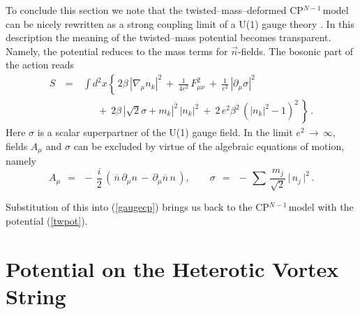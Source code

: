 \documentclass[12pt]{article}
\def\beq{\begin{equation}}
\def\eeq{\end{equation}}
\def\beqn{\begin{eqnarray}}
\def\eeqn{\end{eqnarray}}
\def\beqn{\begin{eqnarray}}
\def\eeqn{\end{eqnarray}}
\newcommand{\pt}{\partial}
\newcommand{\ov}{\overline}
\newcommand{\nbar}{\ov{n}}
\newcommand{\cpn}{CP$^{N-1}$\,}
\begin{document}
	To conclude this section we note that the twisted--mass--deformed \cpn model can be nicely rewritten as a
	strong coupling limit of a U(1) gauge theory \cite{HaHo}. 
	In this description the meaning of the twisted--mass potential becomes  transparent. 
	Namely, the potential  reduces to the mass terms for $\vec{n}$-fields.  
	The bosonic part of the action reads
\beqn
%	
	S 
	& ~=~ &
	\int d^2 x \left\{\,
	 2\beta\,|\nabla_{\mu} n_{k}|^2 ~+~ \frac1{4e^2}\, F^2_{\mu\nu} ~+~ \frac1{e^2}\, |\pt_{\mu}\sigma|^2
	\right.
\nonumber\\[3mm]
%
	&& \quad~ 
	~+~ \left. 2\beta\,| \sqrt{2}\sigma + m_k |^2\, |n_{k}|^2 ~+~
	2\, e^2 \beta^2\, (|n_{k}|^2 -1)^2
	\,\right\}\,.
\label{gaugecp}
\eeqn
	Here $\sigma$ is a scalar superpartner of the U(1) gauge field.
	In the limit $ e^2 \,\to\, \infty$, fields $A_{\mu}$ and $\sigma$ can be excluded by virtue of the algebraic
	equations of motion, namely
\beq
	A_{\mu} ~~=~~ -\, \frac{i}{2}\,\left(\, \nbar\, \pt_{\mu}n \,-\, \pt_{\mu}\nbar \,n \,\right),
\qquad 
	\sigma    ~~=~~    -\, \sum\, \frac{m_j}{\sqrt{2}}\, \big|\, n_j \,\big|^2\,.
\label{Asigma}
\eeq

	Substitution of this into (\ref{gaugecp}) brings us back to the \cpn model with the potential (\ref{twpot}).



\section{Potential on the Heterotic Vortex String}
\setcounter{equation}{0}
\end{document}
